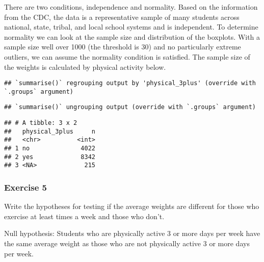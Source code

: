 \documentclass[
]{article}
\newenvironment{Shaded}{\begin{snugshade}}{\end{snugshade}}
\newcommand{\DataTypeTok}[1]{\textcolor[rgb]{0.13,0.29,0.53}{#1}}
\newcommand{\KeywordTok}[1]{\textcolor[rgb]{0.13,0.29,0.53}{\textbf{#1}}}
\newcommand{\NormalTok}[1]{#1}
\newcommand{\OperatorTok}[1]{\textcolor[rgb]{0.81,0.36,0.00}{\textbf{#1}}}
\newcommand{\StringTok}[1]{\textcolor[rgb]{0.31,0.60,0.02}{#1}}
\begin{document}
There are two conditions, independence and normality. Based on the
information from the CDC, the data is a representative sample of many
students across national, state, tribal, and local school systems and is
independent. To determine normality we can look at the sample size and
distribution of the boxplots. With a sample size well over 1000 (the
threshold is 30) and no particularly extreme outliers, we can assume the
normality condition is satisfied. The sample size of the weights is
calculated by physical activity below.

\begin{Shaded}
\end{Shaded}

\begin{verbatim}
## `summarise()` regrouping output by 'physical_3plus' (override with `.groups` argument)
\end{verbatim}

\begin{verbatim}
## `summarise()` ungrouping output (override with `.groups` argument)
\end{verbatim}

\begin{verbatim}
## # A tibble: 3 x 2
##   physical_3plus     n
##   <chr>          <int>
## 1 no              4022
## 2 yes             8342
## 3 <NA>             215
\end{verbatim}

\hypertarget{exercise-5}{%
\subsubsection{Exercise 5}\label{exercise-5}}

Write the hypotheses for testing if the average weights are different
for those who exercise at least times a week and those who don't.

Null hypothesis: Students who are physically active 3 or more days per
week have the same average weight as those who are not physically active
3 or more days per week.
\end{document}
